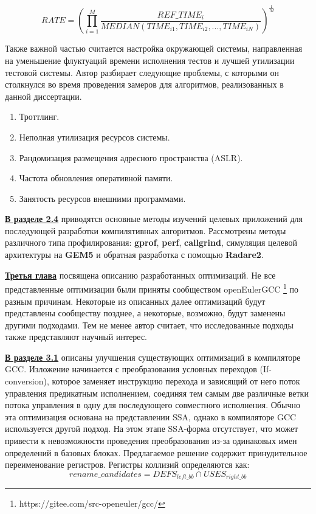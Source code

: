 	\begin{equation}
		RATE =\left(\prod _{i=1}^{M}\dfrac{REF\_TIME_i}{MEDIAN(TIME_{i1}, TIME_{i2}, ... , TIME_{iN})}\right)^{\frac {1}{M}}
	\end{equation} 

Также важной частью считается настройка окружающей системы, направленная
на уменьшение флуктуаций времени исполнения тестов и лучшей
утилизации тестовой системы.  Автор разбирает следующие проблемы, с которыми он столкнулся во время проведения замеров для алгоритмов, реализованных в
данной диссертации.
\begin{enumerate}
	\item Троттлинг.
	\item Неполная утилизация ресурсов системы. 
	\item Рандомизация размещения адресного пространства (ASLR).
	\item Частота обновления оперативной памяти.
	\item Занятость ресурсов внешними программами.
\end{enumerate}

\underline{\textbf{В разделе 2.4}} приводятся основные методы изучений целевых приложений
для последующей разработки компилятивных алгоритмов. Рассмотрены методы различного типа профилирования: \textbf{gprof}, \textbf{perf}, \textbf{callgrind}, симуляция целевой архитектуры на \textbf{GEM5} и обратная разработка с помощью \textbf{Radare2}.



\underline{\textbf{Третья глава}} посвящена описанию разработанных оптимизаций. Не все представленные
оптимизации были приняты сообществом openEulerGCC \footnote{https://gitee.com/src-openeuler/gcc/} по разным причинам.
Некоторые из описанных далее оптимизаций будут представлены сообществу
позднее, а некоторые, возможно, будут заменены другими подходами. Тем не
менее автор считает, что исследованные подходы также представляют научный
интерес.

\underline{\textbf{В разделе 3.1}} описаны улучшения существующих оптимизаций в компиляторе GCC. Изложение начинается с преобразования условных переходов (If-conversion), которое заменяет инструкцию перехода и зависящий
от него поток управления предикатным исполнением, соединяя тем самым две
различные ветки потока управления в одну для последующего совместного исполнения. Обычно эта оптимизация основана на представлении
SSA, однако в компиляторе GCC используется другой подход. На этом этапе
SSA-форма отсутствует, что может привести к невозможности проведения преобразования из-за одинаковых имен определений в базовых блоках.  Предлагаемое решение содержит принудительное переименование регистров. Регистры коллизий определяются как:
\begin{equation}
	rename\_candidates = DEFS_{left\_bb} \cap USES_{right\_bb} 
\end{equation}

